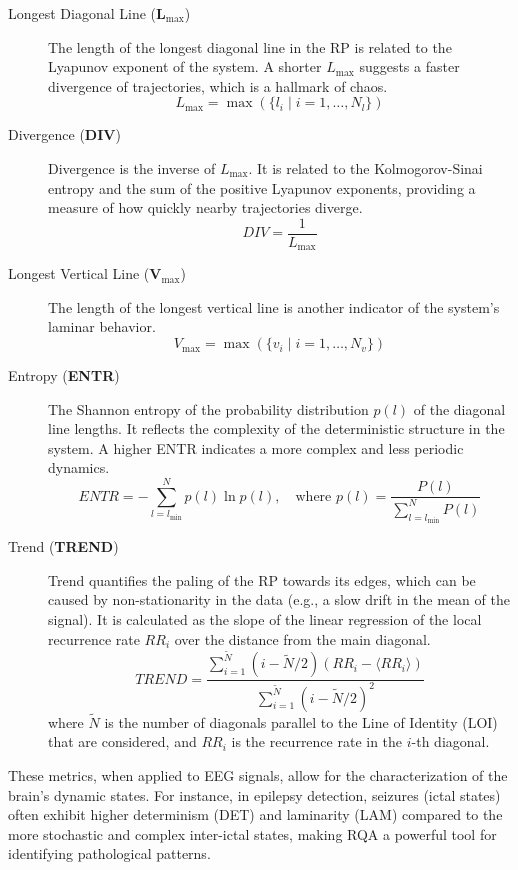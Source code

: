 \documentclass{article}
\begin{document}
\begin{description}
					\item[Longest Diagonal Line (\textbf{L$_{\text{max}}$})]
					The length of the longest diagonal line in the RP is related to the Lyapunov exponent of the system. A shorter \( L_{\text{max}} \) suggests a faster divergence of trajectories, which is a hallmark of chaos.
					\[
					L_{\text{max}} = \max(\{l_i \; | \; i=1,\ldots,N_l\})
					\]

					\item[Divergence (\textbf{DIV})]
					Divergence is the inverse of \( L_{\text{max}} \). It is related to the Kolmogorov-Sinai entropy and the sum of the positive Lyapunov exponents, providing a measure of how quickly nearby trajectories diverge.
					\[
					DIV = \frac{1}{L_{\text{max}}}
					\]

					\item[Longest Vertical Line (\textbf{V$_{\text{max}}$})]
					The length of the longest vertical line is another indicator of the system's laminar behavior.
					\[
					V_{\text{max}} = \max(\{v_i \; | \; i=1,\ldots,N_v\})
					\]

					\item[Entropy (\textbf{ENTR})]
					The Shannon entropy of the probability distribution \( p(l) \) of the diagonal line lengths. It reflects the complexity of the deterministic structure in the system. A higher ENTR indicates a more complex and less periodic dynamics.
					\[
					ENTR = - \sum_{l=l_{\text{min}}}^{N} p(l) \ln p(l), \quad \text{where } p(l) = \frac{P(l)}{\sum_{l=l_{\text{min}}}^{N} P(l)}
					\]

					\item[Trend (\textbf{TREND})]
					Trend quantifies the paling of the RP towards its edges, which can be caused by non-stationarity in the data (e.g., a slow drift in the mean of the signal). It is calculated as the slope of the linear regression of the local recurrence rate \( RR_i \) over the distance from the main diagonal.
					\[
					TREND = \frac{\sum_{i=1}^{\tilde{N}} (i - \tilde{N}/2)(RR_i - \langle RR_i \rangle)}{\sum_{i=1}^{\tilde{N}} (i - \tilde{N}/2)^2}
					\]
					where \( \tilde{N} \) is the number of diagonals parallel to the Line of Identity (LOI) that are considered, and \( RR_i \) is the recurrence rate in the \( i \)-th diagonal.

					\end{description}

					These metrics, when applied to EEG signals, allow for the characterization of the brain's dynamic states. For instance, in epilepsy detection, seizures (ictal states) often exhibit higher determinism (DET) and laminarity (LAM) compared to the more stochastic and complex inter-ictal states, making RQA a powerful tool for identifying pathological patterns.	
\end{document}
